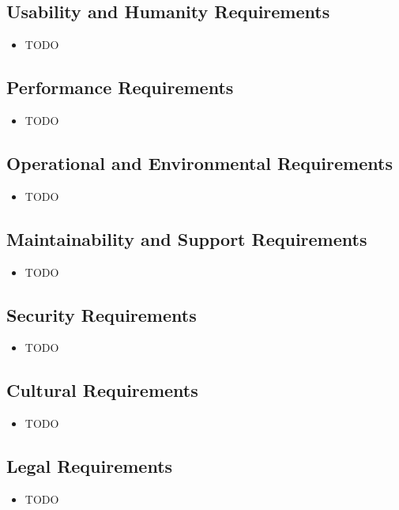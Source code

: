 \documentclass[12pt, titlepage]{article}
\begin{document}
\subsection{Usability and Humanity Requirements}
  \begin{itemize}
    \item TODO
  \end{itemize}

\subsection{Performance Requirements}
  \begin{itemize}
    \item TODO
  \end{itemize}

\subsection{Operational and Environmental Requirements}
  \begin{itemize}
    \item TODO
  \end{itemize}

\subsection{Maintainability and Support Requirements}
  \begin{itemize}
    \item TODO
  \end{itemize}

\subsection{Security Requirements}
  \begin{itemize}
    \item TODO
  \end{itemize}

\subsection{Cultural Requirements}
  \begin{itemize}
    \item TODO
  \end{itemize}

\subsection{Legal Requirements}
  \begin{itemize}
    \item TODO
  \end{itemize}
\end{document}
